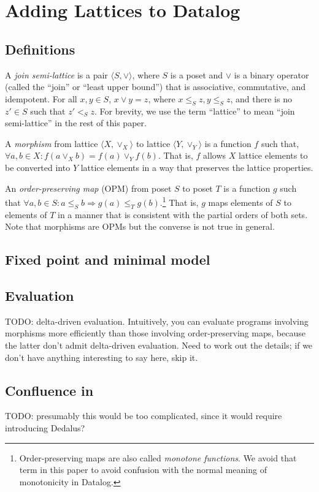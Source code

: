 \section{Adding Lattices to Datalog}
\label{sec:foundation}

\subsection{Definitions}
\label{sec:found-defn}
A \emph{join semi-lattice} is a pair $\langle S, \lor \rangle$, where $S$ is a
poset and $\lor$ is a binary operator (called the ``join'' or ``least upper
bound'') that is associative, commutative, and idempotent. For all $x, y \in S$,
$x \lor y = z$, where $x \leq_S z, y \leq_S z$, and there is no $z' \in S$ such
that $z' <_S z$. For brevity, we use the term ``lattice'' to mean ``join
semi-lattice'' in the rest of this paper.

A \emph{morphism} from lattice $\langle X, \lor_X\rangle$ to lattice $\langle Y,
\lor_Y\rangle$ is a function $f$ such that, $\forall a,b \in X: f(a \lor_X b) =
f(a) \lor_Y f(b)$. That is, $f$ allows $X$ lattice elements to be converted into
$Y$ lattice elements in a way that preserves the lattice properties.

An \emph{order-preserving map} (OPM) from poset $S$ to poset $T$ is a function
$g$ such that $\forall a,b \in S: a \leq_S b \Rightarrow g(a) \leq_T
g(b)$.\footnote{Order-preserving maps are also called \emph{monotone functions}.
  We avoid that term in this paper to avoid confusion with the normal meaning of
  monotonicity in Datalog.} That is, $g$ maps elements of $S$ to elements of $T$
in a manner that is consistent with the partial orders of both sets. Note that
morphisms are OPMs but the converse is not true in general.

\subsection{Fixed point and minimal model}

\subsection{Evaluation}

TODO: delta-driven evaluation. Intuitively, you can evaluate programs involving
morphisms more efficiently than those involving order-preserving maps, because
the latter don't admit delta-driven evaluation. Need to work out the details; if
we don't have anything interesting to say here, skip it.

\subsection{Confluence in \baselang}

TODO: presumably this would be too complicated, since it would require
introducing Dedalus?
